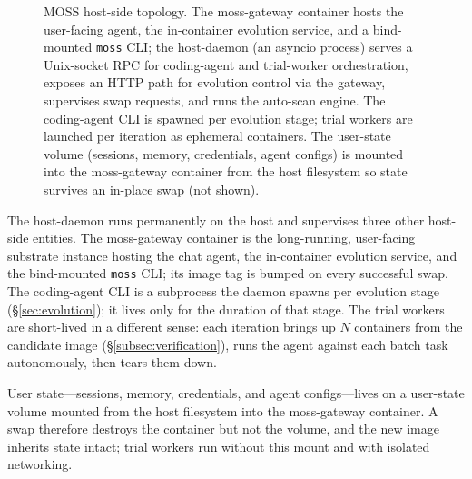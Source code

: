 \begin{figure}[ht]
\begin{tikzpicture}
\end{tikzpicture}
\caption{MOSS host-side topology. The moss-gateway container hosts the user-facing agent, the in-container evolution service, and a bind-mounted \texttt{moss} CLI; the host-daemon (an asyncio process) serves a Unix-socket RPC for coding-agent and trial-worker orchestration, exposes an HTTP path for evolution control via the gateway, supervises swap requests, and runs the auto-scan engine. The coding-agent CLI is spawned per evolution stage; trial workers are launched per iteration as ephemeral containers. The user-state volume (sessions, memory, credentials, agent configs) is mounted into the moss-gateway container from the host filesystem so state survives an in-place swap (not shown).}
\label{fig:topology}
\end{figure}

The host-daemon runs permanently on the host and supervises three other host-side entities. The moss-gateway container is the long-running, user-facing substrate instance hosting the chat agent, the in-container evolution service, and the bind-mounted \texttt{moss} CLI; its image tag is bumped on every successful swap. The coding-agent CLI is a subprocess the daemon spawns per evolution stage (\S\ref{sec:evolution}); it lives only for the duration of that stage. The trial workers are short-lived in a different sense: each iteration brings up $N$ containers from the candidate image (\S\ref{subsec:verification}), runs the agent against each batch task autonomously, then tears them down.

User state---sessions, memory, credentials, and agent configs---lives on a user-state volume mounted from the host filesystem into the moss-gateway container. A swap therefore destroys the container but not the volume, and the new image inherits state intact; trial workers run without this mount and with isolated networking.
